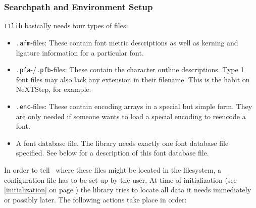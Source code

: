 \subsubsection{Searchpath and Environment Setup}
\verb+t1lib+ basically needs four types of files:
\begin{itemize}
\item \verb+.afm+-files: These contain font metric descriptions as
  well as kerning and ligature information for a particular font.
\item \verb+.pfa+-/\verb+.pfb+-files: These contain the character
  outline descriptions. Type 1 font files may also lack any extension in their
  filename. This is the habit on NeXTStep, for example.
\item \verb+.enc+-files: These contain encoding arrays in a special but
  simple form. They are only  needed if someone wants to load a special
  encoding to reencode a font.
\item A font database file. The library needs exactly one font
  database file specified. See below for a description of this
  font database file.
\end{itemize}
In order to tell \tonelib\ where these files might be located in the
filesystem, a configuration file has to be set up by the user.  
At time of initialization (see \ref{initialization} on page
\pageref{initialization}) the library tries to locate all data it
needs immediately or possibly later. The
following actions take place in order:
